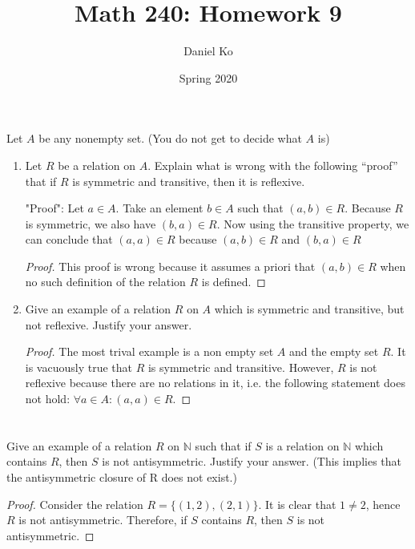 \documentclass[11pt]{scrartcl}
\title{Math 240: Homework 9}
\author{Daniel Ko}
\date{Spring 2020}
\begin{document}
\maketitle

\section{}
Let $A$ be any nonempty set. (You do not get to decide what $A$ is)
\begin{enumerate}[label=\alph*.]
	\item{
	      Let $R$ be a relation on $A$. Explain what is wrong with the following
	      “proof” that if $R$ is symmetric and transitive, then it is reflexive.\par

	      "Proof": Let $a \in A$. Take an element $b \in A$ such that $(a, b) \in R .$ Because $R$ is symmetric,
	      we also have $(b, a) \in R$. Now using the transitive property, we can conclude that $(a, a) \in R$ because
	      $(a, b) \in R$ and $(b, a) \in R$
	      \begin{proof}
		      This proof is wrong because it assumes a priori that $(a, b) \in R$ when no such definition of the relation $R$ is
		      defined.
	      \end{proof}
	      }
	\item{
	      Give an example of a relation $R$ on $A$ which is symmetric and
	      transitive, but not reflexive. Justify your answer.
	      \begin{proof}
		      The most trival example is a non empty set $A$ and the empty set $R$.
		      It is vacuously true that $R$ is symmetric and transitive.
		      However, $R$ is not reflexive because there are no relations in it,
		      i.e. the following statement does not hold: $\forall a \in A : (a,a) \in R$.
	      \end{proof}
	      }
\end{enumerate}

\section{}
Give an example of a relation $R$ on $\mathbb{N}$ such that if $S$ is a relation on $\mathbb{N}$
which contains $R$, then $S$ is not antisymmetric. Justify your answer.
(This implies that the antisymmetric closure of R does not exist.)
\begin{proof}
	Consider the relation $R = \{(1,2),(2,1)\}$. It is clear that $1 \neq 2$, hence $R$ is
	not antisymmetric. Therefore, if $S$ contains $R$, then $S$ is not antisymmetric.
\end{proof}
\end{document}
